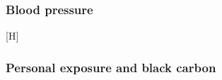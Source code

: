 \documentclass[
  letterpaper,
  DIV=11,
  numbers=noendperiod]{scrartcl}
\makeatletter
\renewenvironment{figure}%
   {\renewcommand\familydefault\sfdefault
    \@float{figure}}
   {\end@float}
\makeatother
\begin{document}
\subsubsection{Blood pressure}\label{blood-pressure-1}

\begin{figure}[H]

\caption{\label{fig-afig-pt-bc}Comparison of pre-interventions trends in
blood pressure between waves 1 and 2 for never treated and villages
treated later.}


\end{figure}%

\subsubsection{Personal exposure and black
carbon}\label{personal-exposure-and-black-carbon}
\end{document}
